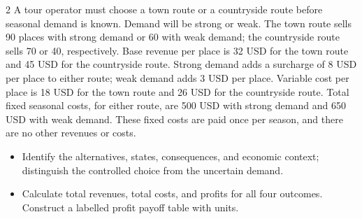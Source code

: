 \begin{multicols}{2}
A tour operator must choose a town route or a countryside route before seasonal demand is known. Demand will be strong or weak. The town route sells 90 places with strong demand or 60 with weak demand; the countryside route sells 70 or 40, respectively. Base revenue per place is 32 USD for the town route and 45 USD for the countryside route. Strong demand adds a surcharge of 8 USD per place to either route; weak demand adds 3 USD per place. Variable cost per place is 18 USD for the town route and 26 USD for the countryside route. Total fixed seasonal costs, for either route, are 500 USD with strong demand and 650 USD with weak demand. These fixed costs are paid once per season, and there are no other revenues or costs.
\begin{itemize}
\item[\textbf{(C1)}] Identify the alternatives, states, consequences, and economic context; distinguish the controlled choice from the uncertain demand. 
\item[\textbf{(C3)}] Calculate total revenues, total costs, and profits for all four outcomes. Construct a labelled profit payoff table with units. 
\end{itemize}
\end{multicols}
\clearpage
